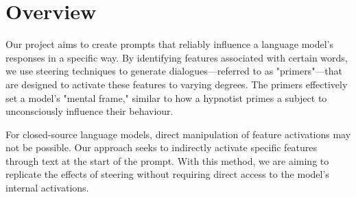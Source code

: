 \documentclass[11pt,a4paper]{article}
\begin{document}
\section{Overview}

Our project aims to create prompts that reliably influence a language model's responses in a specific way. By identifying features associated with certain words, we use steering techniques to generate dialogues—referred to as "primers"—that are designed to activate these features to varying degrees. The primers effectively set a model's "mental frame," similar to how a hypnotist primes a subject to unconsciously influence their behaviour.

For closed-source language models, direct manipulation of feature activations may not be possible. Our approach seeks to indirectly activate specific features through text at the start of the prompt. With this method, we are aiming to replicate the effects of steering without requiring direct access to the model's internal activations.
\end{document}
